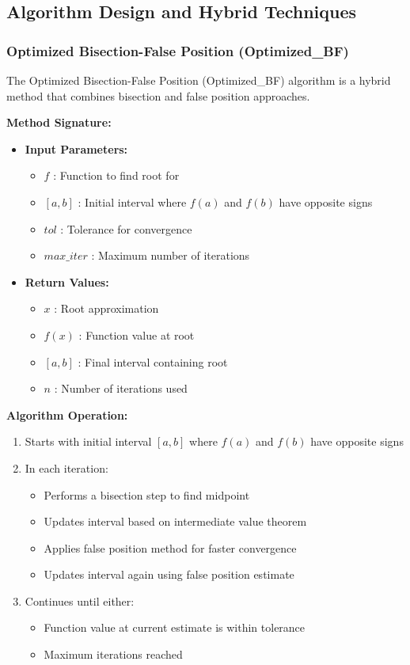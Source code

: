\documentclass[reprint, amsmath, amssymb, aps, prl]{revtex4-2}
\begin{document}
\subsection{Algorithm Design and Hybrid Techniques}

\subsubsection{Optimized Bisection-False Position (Optimized\_BF)}

The Optimized Bisection-False Position (Optimized\_BF) algorithm is a hybrid method that combines bisection and false position approaches.

\textbf{Method Signature:}
\begin{itemize}
    \item \textbf{Input Parameters:}
    \begin{itemize}
        \item $f$ : Function to find root for
        \item $[a, b]$ : Initial interval where $f(a)$ and $f(b)$ have opposite signs
        \item $tol$ : Tolerance for convergence
        \item $max\_iter$ : Maximum number of iterations
    \end{itemize}
    \item \textbf{Return Values:}
    \begin{itemize}
        \item $x$ : Root approximation
        \item $f(x)$ : Function value at root
        \item $[a, b]$ : Final interval containing root
        \item $n$ : Number of iterations used
    \end{itemize}
\end{itemize}

\textbf{Algorithm Operation:}
\begin{enumerate}
    \item Starts with initial interval $[a, b]$ where $f(a)$ and $f(b)$ have opposite signs
    \item In each iteration:
        \begin{itemize}
            \item Performs a bisection step to find midpoint
            \item Updates interval based on intermediate value theorem
            \item Applies false position method for faster convergence
            \item Updates interval again using false position estimate
        \end{itemize}
    \item Continues until either:
        \begin{itemize}
            \item Function value at current estimate is within tolerance
            \item Maximum iterations reached
        \end{itemize}
\end{enumerate}
\end{document}
